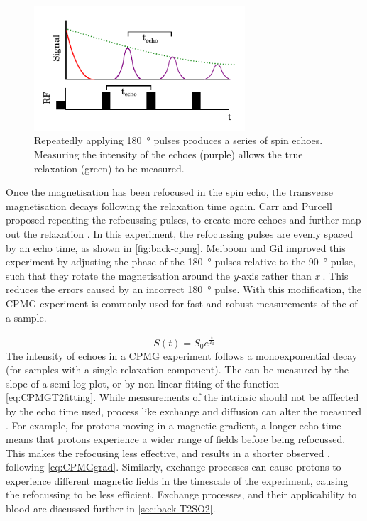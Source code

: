\begin{figure}[t]
\centering
\includegraphics[width=0.7\textwidth]{figures/background/cpmg.pdf}
\caption[CPMG pulse sequence]{Repeatedly applying \SI{180}{\degree} pulses produces a series of spin echoes. Measuring the intensity of the echoes (purple) allows the true \Ttwo relaxation (green) to be measured.}
\label{fig:back-cpmg}
\end{figure}

Once the magnetisation has been refocused in the spin echo, the transverse magnetisation decays following the \Ttwostar relaxation time again.
Carr and Purcell proposed repeating the refocussing pulses, to create more echoes and further map out the \Ttwo relaxation \cite{CarrEffectsDiffusionFree1954}.
In this experiment, the refocussing pulses are evenly spaced by an echo time, as shown in \autoref{fig:back-cpmg}.
Meiboom and Gil improved this experiment by adjusting the phase of the \SI{180}{\degree} pulses relative to the \SI{90}{\degree} pulse, such that they rotate the magnetisation around the \textit{y}-axis rather than \textit{x} \cite{MeiboomModifiedSpinEcho1958}.
This reduces the errors caused by an incorrect \SI{180}{\degree} pulse.
With this modification, the CPMG experiment is commonly used for fast and robust measurements of the \Ttwo of a sample.

\begin{equation}
S(t) = S_0 e^{\frac{t}{T_2}}
\label{eq:CPMGT2fitting}
\end{equation}
The intensity of echoes in a CPMG experiment follows a monoexponential decay (for samples with a single relaxation component).
The \Ttwo can be measured by the slope of a semi-log plot, or by non-linear fitting of the function \ref{eq:CPMGT2fitting}.
While measurements of the intrinsic \Ttwo should not be afffected by the echo time used, process like exchange and diffusion can alter the measured \Ttwo.
For example, for protons moving in a magnetic gradient, a longer echo time means that protons experience a wider range of \Bzero fields before being refocussed.
This makes the refocusing less effective, and results in a shorter observed \Ttwo, following \autoref{eq:CPMGgrad}.
Similarly, exchange processes can cause protons to experience different magnetic fields in the timescale of the experiment, causing the refocussing to be less efficient.
Exchange processes, and their applicability to blood are discussed further in \autoref{sec:back-T2SO2}.

